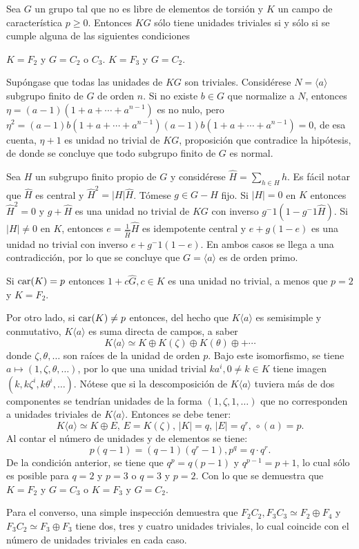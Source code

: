 \begin{proposicion}\label{prop:UnidadesTriviales}
Sea $G$ un grupo tal que no es libre de elementos de torsión y $K$ un campo de característica $p\geq 0$. Entonces $KG$ sólo tiene unidades triviales si y sólo si se cumple alguna de las siguientes condiciones
\begin{bulletList}
\newItem $K=F_2$ y $G=C_2$ o $C_3$.
\newItem $K=F_3$ y $G=C_2$.
\end{bulletList}
\end{proposicion}
\begin{proof*}
Supóngase que todas las unidades de $KG$ son triviales. Considérese $N=\langle a \rangle$ subgrupo finito de $G$ de orden $n$. Si no existe $b \in G$ que normalize a $N$, entonces $\eta = (a-1)(1+a+\cdots + a^{n-1})$ es no nulo, pero $\eta^2 = (a-1)b(1+a+\cdots+a^{n-1})(a-1)b(1+a+\cdots+a^{n-1})=0$, de esa cuenta, $\eta +1$ es unidad no trivial de $KG$, proposición que contradice la hipótesis, de donde se concluye que todo subgrupo finito de $G$ es normal.

Sea $H$ un subgrupo finito propio de $G$ y considérese $\hat{H} = \sum_{h \in H}h$. Es fácil notar que  $\hat{H}$ es central y $\hat{H}^2 = |H|\hat{H} $. Tómese $g \in G-H$ fijo. Si $|H| =0$ en $K$ entonces $\hat{H}^2 = 0$ y $g + \hat{H}$ es una unidad no trivial de $KG$ con inverso $g^-1(1-g^-1\hat{H})$. Si $|H| \neq 0$ en $K$, entonces $e = \frac{1}{\hat{H}}\hat{H}$ es idempotente central y $e +g(1-e)$ es una unidad no trivial con inverso $e+g^-1(1-e)$. En ambos casos se llega a una contradicción, por lo que se concluye que $G = \langle a \rangle$ es de orden primo.

Si $\operatorname{car} (K) = p$ entonces $1+c\hat{G}, c \in K$ es una unidad no trivial, a menos que $p=2$ y $K=F_2$. 

Por otro lado, si $\operatorname{car}(K) \neq p$ entonces, del hecho que $K\langle a \rangle$ es semisimple y conmutativo, $K\langle a \rangle$ es suma directa de campos, a saber
\[ K \langle a \rangle \simeq K\oplus K(\zeta) \oplus K(\theta) \oplus + \cdots \] donde $\zeta, \theta, \dots$ son raíces de la unidad de orden $p$. Bajo este isomorfismo, se tiene $a \mapsto (1,\zeta,\theta,\dots)$, por lo que una unidad trivial $ka^ i, 0\neq k \in K$ tiene imagen $(k,k\zeta^i,k\theta^i,\dots)$. Nótese que si la descomposición de $K\langle a\rangle$ tuviera más de dos componentes se tendrían unidades de la forma $(1,\zeta,1,\dots)$ que no corresponden a unidades triviales de $K\langle a \rangle$.
Entonces se debe tener: \[ K\langle a \rangle \simeq K \oplus E\mbox{, } E = K(\zeta)\mbox{, } |K|=q\mbox{, } |E|=q^r\mbox{, } \circ(a) = p. \] Al contar el número de unidades y de elementos se tiene: \[ p(q-1) = (q-1)(q^r-1), p^q = q\cdot q^r. \] 
\indent De la condición anterior, se tiene que $q^p = q(p-1)$ y $q^{p-1} = p+1$, lo cual sólo es posible para $q=2$ y $p=3$ o $q=3$ y $p=2$. Con lo que se demuestra que $K=F_2$ y $G=C_3$ o $K=F_3$ y $G=C_2$.

Para el converso, una simple inspección demuestra que $F_2C_2, F_3C_3 \simeq F_2\oplus F_4$ y $F_3C_2 \simeq F_3 \oplus F_3$ tiene dos, tres y cuatro unidades triviales, lo cual coincide con el número de unidades triviales en cada caso. 
\end{proof*}

